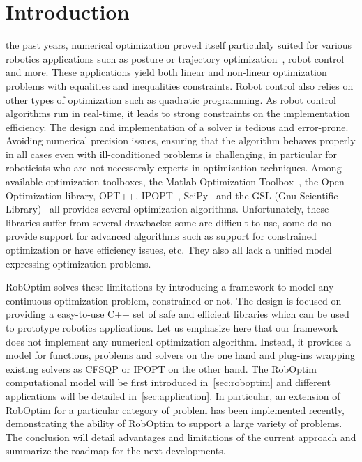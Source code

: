 \documentclass[conference,final,a4paper,twocolumn,9pt]{IEEEtran}
\begin{document}
\IEEEpeerreviewmaketitle

\section{Introduction}\label{sec:introduction}


 the past years, numerical optimization proved
itself particulaly suited for various robotics applications such as
posture or trajectory optimization~\cite{miossec06,saab-tro-12}, robot
control~\cite{mansard-icra-12} and more. These applications yield both
linear and non-linear optimization problems with equalities and
inequalities constraints. Robot control also relies on other types of
optimization such as quadratic programming. As robot control
algorithms run in real-time, it leads to strong constraints on the
implementation efficiency. The design and implementation of a solver
is tedious and error-prone. Avoiding numerical precision issues,
ensuring that the algorithm behaves properly in all cases even with
ill-conditioned problems is challenging, in particular for roboticists
who are not necesseraly experts in optimization techniques. Among
available optimization toolboxes, the Matlab Optimization
Toolbox~\cite{matlab}, the Open Optimization library, OPT++,
IPOPT~\cite{ipopt}, SciPy~\cite{scipy} and the GSL (Gnu Scientific
Library)~\cite{gsl} all provides several optimization
algorithms. Unfortunately, these libraries suffer from several
drawbacks: some are difficult to use, some do no provide support for
advanced algorithms such as support for constrained optimization or
have efficiency issues, etc. They also all lack a unified model
expressing optimization problems.


RobOptim solves these limitations by introducing a framework to model
any continuous optimization problem, constrained or not. The design is
focused on providing a easy-to-use C++ set of safe and efficient
libraries which can be used to prototype robotics applications.  Let
us emphasize here that our framework does not implement any numerical
optimization algorithm. Instead, it provides a model for functions,
problems and solvers on the one hand and plug-ins wrapping existing
solvers as CFSQP or IPOPT on the other hand.  The RobOptim
computational model will be first introduced in~\autoref{sec:roboptim}
and different applications will be detailed
in~\autoref{sec:application}. In particular, an extension of RobOptim
for a particular category of problem has been implemented recently,
demonstrating the ability of RobOptim to support a large variety of
problems. The conclusion will detail advantages and limitations of the
current approach and summarize the roadmap for the next developments.
\end{document}
